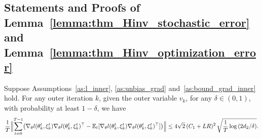 \documentclass[11 pt]{article}
\begin{document}
\subsection{Statements and Proofs of Lemma~\ref{lemma:thm_Hinv_stochastic_error} and Lemma~\ref{lemma:thm_Hinv_optimization_error}}
\begin{lemma}\label{lemma:thm_Hinv_stochastic_error}
Suppose Assumptions~\ref{as:l_inner}, \ref{as:unbias_grad} and~\ref{as:bound_grad_inner} hold. For any outer iteration $k$, given the outer variable $v_k$, for any $\delta \in (0,1)$, with probability at least $1-\delta$, we have
\begin{align*}
\frac{1}{T}\Bigl\|
\sum_{t=0}^{T-1}
\bigl(
\nabla_\theta l(\theta_k^{t},\xi_k^t)\nabla_\theta l(\theta_k^{t},\xi_k^t)^\top
-
\mathbb{E}_t[
\nabla_\theta l(\theta_k^{t},\xi_k^t)\nabla_\theta l(\theta_k^{t},\xi_k^t)^\top
]
\bigr)
\Bigr\|  \leq 4\sqrt{2}\, (C_1 + LR)^2\, \sqrt{\frac{1}{T}\log\left(2d_2/\delta\right)}.
\end{align*} 
\end{lemma}
\end{document}
